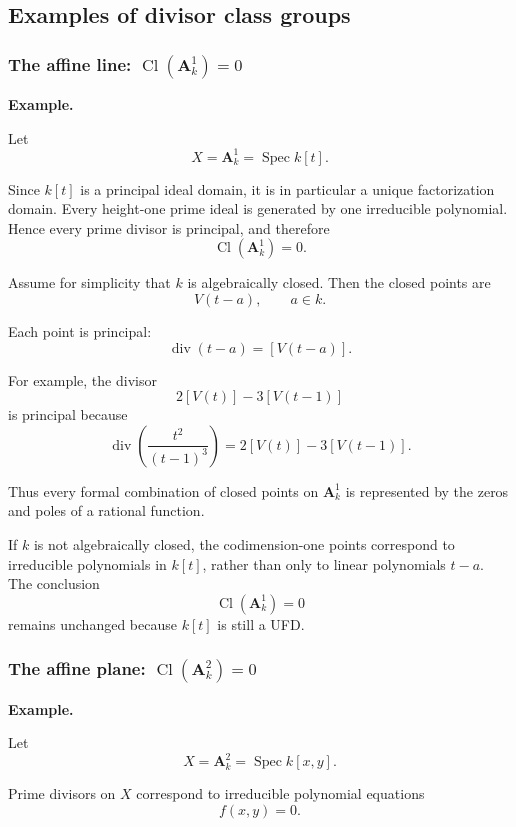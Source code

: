 \subsection{Examples of divisor class groups}

\subsubsection{\texorpdfstring{The affine line: \(\operatorname{Cl}(\mathbf A^1_k)=0\)}{The affine line}}

\textbf{Example.}

Let
\[
X=\mathbf A^1_k=\operatorname{Spec}k[t].
\]

Since \(k[t]\) is a principal ideal domain, it is in particular a unique factorization domain. Every height-one prime ideal is generated by one irreducible polynomial. Hence every prime divisor is principal, and therefore
\[
\boxed{
	\operatorname{Cl}(\mathbf A^1_k)=0.
}
\]

Assume for simplicity that \(k\) is algebraically closed. Then the closed points are
\[
V(t-a),
\qquad a\in k.
\]

Each point is principal:
\[
\operatorname{div}(t-a)=[V(t-a)].
\]

For example, the divisor
\[
2[V(t)]-3[V(t-1)]
\]
is principal because
\[
\operatorname{div}\left(\frac{t^2}{(t-1)^3}\right)
=
2[V(t)]-3[V(t-1)].
\]

Thus every formal combination of closed points on \(\mathbf A^1_k\) is represented by the zeros and poles of a rational function.

\begin{remark}
	If \(k\) is not algebraically closed, the codimension-one points correspond to irreducible polynomials in \(k[t]\), rather than only to linear polynomials \(t-a\). The conclusion
	\[
	\operatorname{Cl}(\mathbf A^1_k)=0
	\]
	remains unchanged because \(k[t]\) is still a UFD.
\end{remark}

\subsubsection{\texorpdfstring{The affine plane: \(\operatorname{Cl}(\mathbf A^2_k)=0\)}{The affine plane}}

\textbf{Example.}

Let
\[
X=\mathbf A^2_k=\operatorname{Spec}k[x,y].
\]

Prime divisors on \(X\) correspond to irreducible polynomial equations
\[
f(x,y)=0.
\]

